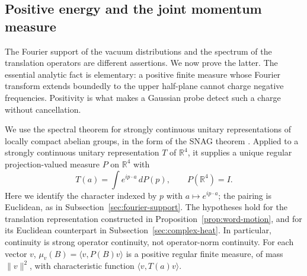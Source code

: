 \subsection{Positive energy and the joint momentum measure}
\label{sec:spectral-measure}
The Fourier support of the vacuum distributions and the spectrum of the
translation operators are different assertions. We now prove the latter.
The essential analytic fact is elementary: a positive finite measure whose
Fourier transform extends boundedly to the upper half-plane cannot charge
negative frequencies. Positivity is what makes a Gaussian probe detect
such a charge without cancellation.

We use the spectral theorem for strongly continuous unitary representations
of locally compact abelian groups, in the form of the SNAG theorem
\cite[Theorem D.3.1, p.397]{BHV}. Applied to a strongly continuous unitary
representation $T$ of $\mathbb R^4$, it supplies a unique regular
projection-valued measure $P$ on $\mathbb R^4$ with
\begin{equation}\label{eq:snag-convention}
 T(a)=\int e^{ip\cdot a}\,dP(p),\qquad P(\mathbb R^4)=I.
\end{equation}
Here we identify the character indexed by $p$ with $a\mapsto e^{ip\cdot a}$;
the pairing is Euclidean, as in Subsection~\ref{sec:fourier-support}.
The hypotheses hold for the translation representation constructed in
Proposition~\ref{prop:word-motion}, and for its Euclidean counterpart in
Subsection~\ref{sec:complex-heat}. In particular, continuity is strong operator
continuity, not operator-norm continuity. For each vector $v$,
$\mu_v(B)=\langle v,P(B)v\rangle$ is a positive regular finite measure,
of mass $\|v\|^2$, with characteristic function $\langle v,T(a)v\rangle$.

